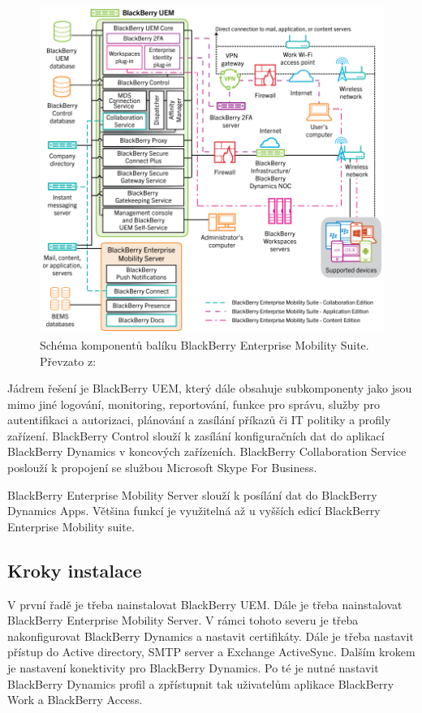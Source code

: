 \begin{figure}[h!]
\centering
\includegraphics[width=13cm]{img/BBEMS}
\caption{Schéma komponentů balíku BlackBerry Enterprise Mobility Suite. Převzato z: \cite{BBUEM}}\label{BBEMS}
\end{figure}%

Jádrem řešení je BlackBerry UEM, který dále obsahuje subkomponenty jako jsou mimo jiné logování, monitoring, reportování, funkce pro správu, služby pro autentifikaci a autorizaci, plánování a zasílání příkazů či IT politiky a profily zařízení. BlackBerry Control slouží k zasílání konfiguračních dat do aplikací BlackBerry Dynamics v koncových zařízeních. BlackBerry Collaboration Service poslouží k propojení se službou Microsoft Skype For Business. 

BlackBerry Enterprise Mobility Server slouží k posílání dat do BlackBerry Dynamics Apps. Většina funkcí je využitelná až u vyšších edicí BlackBerry Enterprise Mobility suite.

\subsection{Kroky instalace}
V první řadě je třeba nainstalovat BlackBerry UEM. Dále je třeba nainstalovat BlackBerry Enterprise Mobility Server. V rámci tohoto severu je třeba nakonfigurovat BlackBerry Dynamics a nastavit certifikáty.  Dále je třeba nastavit přístup do Active directory, SMTP server a Exchange ActiveSync. Dalším krokem je nastavení konektivity pro BlackBerry Dynamics. Po té je nutné nastavit BlackBerry Dynamics profil a zpřístupnit tak uživatelům aplikace BlackBerry Work a BlackBerry Access. 

